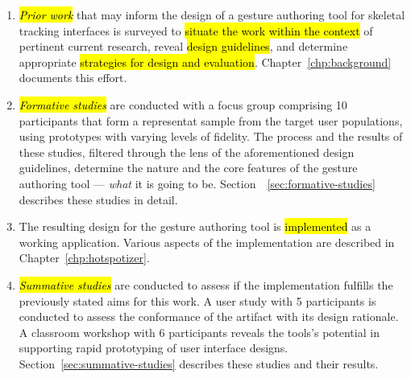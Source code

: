 \begin{enumerate}
\item \hl{\emph{Prior work}} that may inform the design of a gesture authoring tool for skeletal tracking interfaces is surveyed to \hl{situate the work within the context} of pertinent current research, reveal \hl{design guidelines}, and determine appropriate \hl{strategies for design and evaluation}. Chapter~\ref{chp:background} documents this effort.
\item \hl{\emph{Formative studies}} are conducted with a focus group comprising 10 participants that form a representat sample from the target user populations, using prototypes with varying levels of fidelity. The process and the results of these studies, filtered through the lens of the aforementioned design guidelines, determine the nature and the core features of the gesture authoring tool --- \emph{what} it is going to be. Section~~\ref{sec:formative-studies} describes these studies in detail.
\item The resulting design for the gesture authoring tool is \hl{implemented} as a working application. Various aspects of the implementation are described in Chapter~\ref{chp:hotspotizer}.
\item \hl{\emph{Summative studies}} are conducted to assess if the implementation fulfills the previously stated aims for this work. A user study with 5 participants is conducted to assess the conformance of the artifact with its design rationale. A classroom workshop with 6 participants reveals the tools's potential in supporting rapid prototyping of user interface designs. Section~\ref{sec:summative-studies} describes these studies and their results.
\end{enumerate}
